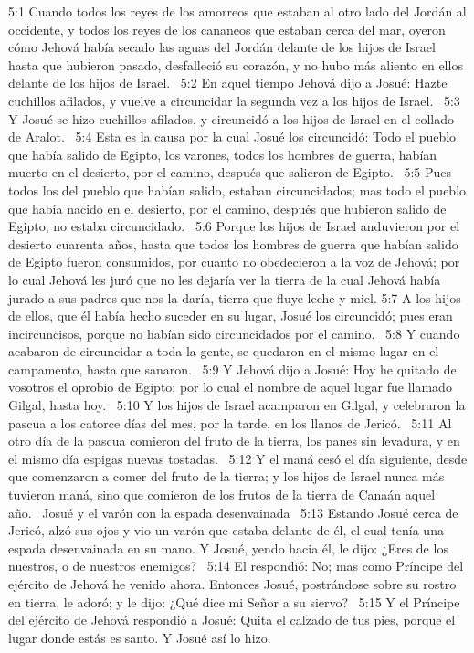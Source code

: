 5:1 Cuando todos los reyes de los amorreos que estaban al otro lado del Jordán al occidente, y todos los reyes de los cananeos que estaban cerca del mar, oyeron cómo Jehová había secado las aguas del Jordán delante de los hijos de Israel hasta que hubieron pasado, desfalleció su corazón, y no hubo más aliento en ellos delante de los hijos de Israel.  
5:2 En aquel tiempo Jehová dijo a Josué: Hazte cuchillos afilados, y vuelve a circuncidar la segunda vez a los hijos de Israel.  
5:3 Y Josué se hizo cuchillos afilados, y circuncidó a los hijos de Israel en el collado de Aralot.  
5:4 Esta es la causa por la cual Josué los circuncidó: Todo el pueblo que había salido de Egipto, los varones, todos los hombres de guerra, habían muerto en el desierto, por el camino, después que salieron de Egipto.  
5:5 Pues todos los del pueblo que habían salido, estaban circuncidados; mas todo el pueblo que había nacido en el desierto, por el camino, después que hubieron salido de Egipto, no estaba circuncidado.  
5:6 Porque los hijos de Israel anduvieron por el desierto cuarenta años, hasta que todos los hombres de guerra que habían salido de Egipto fueron consumidos, por cuanto no obedecieron a la voz de Jehová; por lo cual Jehová les juró que no les dejaría ver la tierra de la cual Jehová había jurado a sus padres que nos la daría, tierra que fluye leche y miel. 
5:7 A los hijos de ellos, que él había hecho suceder en su lugar, Josué los circuncidó; pues eran incircuncisos, porque no habían sido circuncidados por el camino.  
5:8 Y cuando acabaron de circuncidar a toda la gente, se quedaron en el mismo lugar en el campamento, hasta que sanaron.  
5:9 Y Jehová dijo a Josué: Hoy he quitado de vosotros el oprobio de Egipto; por lo cual el nombre de aquel lugar fue llamado Gilgal, hasta hoy.  
5:10 Y los hijos de Israel acamparon en Gilgal, y celebraron la pascua a los catorce días del mes, por la tarde, en los llanos de Jericó.  
5:11 Al otro día de la pascua comieron del fruto de la tierra, los panes sin levadura, y en el mismo día espigas nuevas tostadas.  
5:12 Y el maná cesó el día siguiente, desde que comenzaron a comer del fruto de la tierra; y los hijos de Israel nunca más tuvieron maná, sino que comieron de los frutos de la tierra de Canaán aquel año.  
Josué y el varón con la espada desenvainada  
5:13 Estando Josué cerca de Jericó, alzó sus ojos y vio un varón que estaba delante de él, el cual tenía una espada desenvainada en su mano. Y Josué, yendo hacia él, le dijo: ¿Eres de los nuestros, o de nuestros enemigos?  
5:14 El respondió: No; mas como Príncipe del ejército de Jehová he venido ahora. Entonces Josué, postrándose sobre su rostro en tierra, le adoró; y le dijo: ¿Qué dice mi Señor a su siervo?  
5:15 Y el Príncipe del ejército de Jehová respondió a Josué: Quita el calzado de tus pies, porque el lugar donde estás es santo. Y Josué así lo hizo.  
